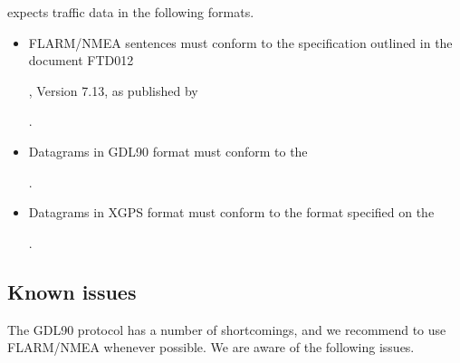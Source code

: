 \documentclass[letterpaper,10pt,english]{sphinxmanual}
\begin{document}
\sphinxAtStartPar
{} expects traffic data in the following formats.
\begin{itemize}
\item {} 
\sphinxAtStartPar
FLARM/NMEA sentences must conform to the specification outlined in the
document FTD\sphinxhyphen{}012 %
\begin{footnote}[84]\sphinxAtStartFootnote
{}
%
\end{footnote}, Version 7.13, as published
by %
\begin{footnote}[85]\sphinxAtStartFootnote
{}
%
\end{footnote}.

\item {} 
\sphinxAtStartPar
Datagrams in GDL90 format must conform to the %
\begin{footnote}[86]\sphinxAtStartFootnote
{}
%
\end{footnote}.

\item {} 
\sphinxAtStartPar
Datagrams in XGPS format must conform to the format specified on the
%
\begin{footnote}[87]\sphinxAtStartFootnote
{}
%
\end{footnote}.

\end{itemize}


\subsection{Known issues}
\label{\detokenize{04-appendix/technical:known-issues}}
\sphinxAtStartPar
The GDL90 protocol has a number of shortcomings, and we recommend to use
FLARM/NMEA whenever possible.  We are aware of the following issues.
\end{document}
